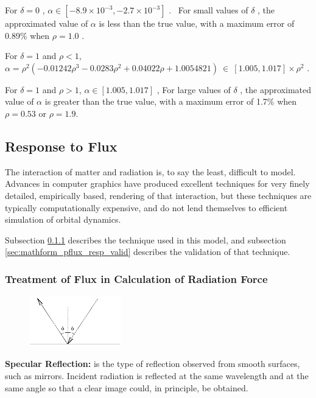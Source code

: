     For  $\delta =0$ ,  $\alpha \in \left[-8.9\times
    10^{-3},-2.7\times 10^{-3}\right]$ . \ For small values of \textit{
    $\delta $ }, the approximated value of  $\alpha $ is less than the true
    value,
    with a maximum error of 0.89\% when  $\rho =1.0$ .

    For  $\delta =1$ and $\rho <1$,
    $\alpha =\rho ^{2}\left(-0.01242\rho
    ^{3}-0.0283\rho ^{2}+0.04022\rho +1.0054821\right)\ \in
    \ \left[1.005,1.017\right]\times \rho ^{2}$ .

    For  $\delta =1$ and $\rho >1$,
    $\alpha \in \left[1.005,1.017\right]$ ,
    For large values of\textit{ $\delta $ }, the approximated value of
    $\alpha $ is greater than the true value, with a maximum error of 1.7\% when
    $\rho =0.53$ or  $\rho =1.9$.

  \subsection{Response to Flux}\label{sec:mathform_pflux_resp}
    The interaction of matter and radiation is, to say the least, difficult to
    model.  Advances in computer graphics have produced excellent techniques
    for very finely detailed, empirically based, rendering of that interaction,
    but these techniques are typically computationally expensive, and do not
    lend themselves to efficient simulation of orbital dynamics.

    Subsection \ref{sec:mathform_pflux_resp_desc} describes the technique
    used in this model, and subsection
    \ref{sec:mathform_pflux_resp_valid} describes the validation of
    that technique.


    \subsubsection{Treatment of Flux in Calculation of Radiation
    Force}\label{sec:mathform_pflux_resp_desc}


     \begin{figure}
     \includegraphics[width = 40mm]{figs/sda/1_sda.jpg}
     \end{figure}
     \textbf{Specular Reflection:} is the type of reflection observed
     from smooth surfaces, such as mirrors. Incident radiation is
     reflected at the same wavelength and at the same angle so that a
     clear image could, in principle, be obtained.

